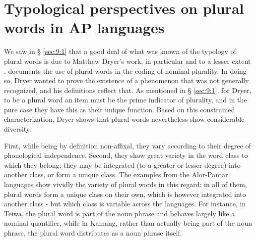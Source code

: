 \section{Typological perspectives on plural words in AP languages} %
\label{sec:9:5}
We saw in {\S} \ref{sec:9:1} that a good deal of what was known of the typology of plural words is due to Matthew Dryer's work, in particular \citet{Dryer1989,Dryer2011} and to a lesser extent \citet{Dryer2007}. \citet{Dryer2011} documents the use of plural words in the coding of nominal plurality. In doing so, Dryer wanted to prove the existence of a phenomenon that was not generally recognized, and his definitions reflect that. As mentioned in {\S} \ref{sec:9:1}, for Dryer, to be a plural word an item must be the prime indicator of plurality, and in the pure case they have this as their unique function. Based on this constrained characterization, Dryer shows that plural words nevertheless show considerable diversity.

 First, while being by definition non-affixal, they vary according to their degree of phonological independence. Second, they show great variety in the word class to which they belong; they may be integrated (to a greater or lesser degree) into another class, or form a unique class. The examples from the Alor-Pantar languages show vividly the variety of plural words in this regard: in all of them, plural words form a unique class on their own, which is however integrated into another class - but which class is variable across the languages. For instance, in Teiwa, the plural word is part of the noun phrase and behaves largely like a nominal quantifier, while in Kamang, rather than actually being part of the noun phrase, the plural word distributes as a noun phrase itself.

